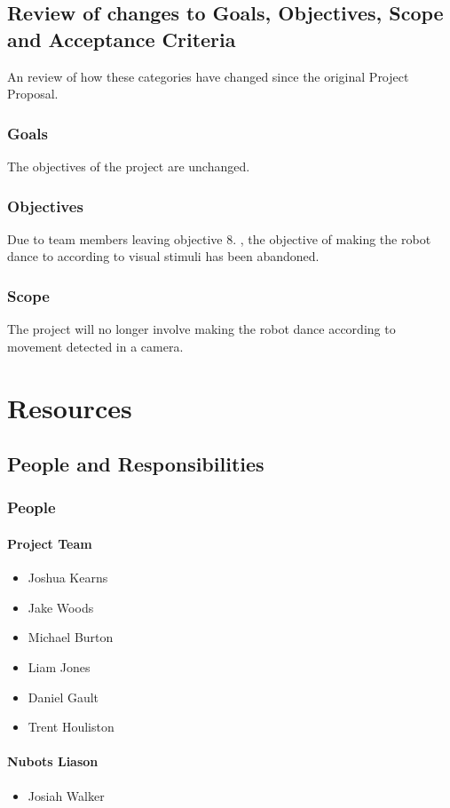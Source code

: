 \documentclass[a4paper]{article}
\begin{document}
		\subsection {Review of changes to Goals, Objectives, Scope and Acceptance Criteria}
			An review of how these categories have changed since the original Project Proposal.
			\subsubsection{Goals}
				The objectives of the project are unchanged.
			\subsubsection{Objectives}
				 Due to team members leaving objective 8. , the objective of making the robot dance to according to visual stimuli has been abandoned.
			\subsubsection{Scope}
				The project will no longer involve making the robot dance according to movement detected in a camera.

	\section{Resources}
		\subsection{People and Responsibilities}
			\subsubsection{People}
				\paragraph{Project Team}
					\begin{itemize}
						\item Joshua Kearns
						\item Jake Woods
						\item Michael Burton
						\item Liam Jones
						\item Daniel Gault
						\item Trent Houliston
					\end{itemize}
				\paragraph{Nubots Liason}
					\begin{itemize}
						\item Josiah Walker
					\end{itemize}
\end{document}
